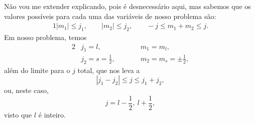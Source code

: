 \documentclass{article}
\begin{document}
Não vou me extender explicando, pois é desnecessário aqui, mas sabemos que os valores possíveis para cada uma das variáveis de nosso problema são:
\begin{alignat}{1}
 |m_1| \leq j_1 \mathrm{,} \qquad |m_2| \leq j_2 \mathrm{,} \qquad -j \leq m_1 + m_2 \leq j\mathrm{.}
\end{alignat}
Em nosso problema, temos
\begin{alignat}{2}
 \nonumber
 &j_1 = l \mathrm{,} \qquad &&m_1 = m_l\mathrm{,} \\
 &j_2 = s = \frac{1}{2} \mathrm{,} \qquad &&m_2 = m_s = \pm \frac{1}{2}\mathrm{,}
\end{alignat}
além do limite para o $j$ total, que nos leva a
\begin{equation}
 |j_1 - j_2| \leq j \leq j_1 + j_2\mathrm{,}
\end{equation}
ou, neste caso,
\begin{equation}
 j = l - \frac{1}{2} \mathrm{,\ } l + \frac{1}{2}\mathrm{,}
\end{equation}
visto que $l$ é inteiro.
\end{document}
